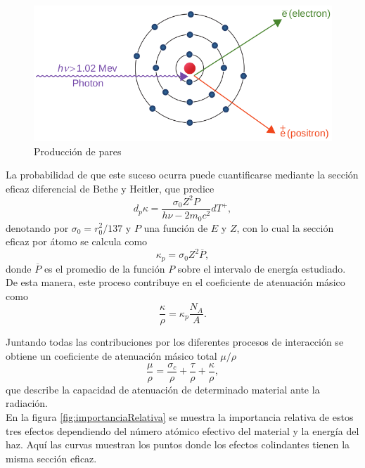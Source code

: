 \begin{figure}[H]
	\centering
	\includegraphics[width=0.7\linewidth]{images/produccionPares.png}
	\caption{Producción de pares \cite{khan2014the}}
	\label{fig:Pares}
\end{figure}

La probabilidad de que este suceso ocurra puede cuantificarse mediante la sección eficaz diferencial de Bethe y Heitler, que predice 
\begin{equation}
	d_{p}\kappa=\frac{\sigma_0 Z^2 P}{h\nu -2m_0c^2}dT^{+}, 
\end{equation}
denotando por $\sigma_0=r_{0}^2/137$ y $P$ una función de $E$ y $Z$, con lo cual la sección eficaz por átomo se calcula como
\begin{equation}
	\kappa_{p}=\sigma_0Z^2\overline{P},
\end{equation}
donde $\overline{P}$ es el promedio de la función $P$ sobre el intervalo de energía estudiado.\\

De esta manera, este proceso contribuye en el coeficiente de atenuación másico como
\begin{equation}
	\frac{\kappa}{\rho}=\kappa_{p}\frac{N_A}{A}.
\end{equation}

Juntando todas las contribuciones por los diferentes procesos de interacción se obtiene un coeficiente de atenuación másico total $\mu/\rho$
\begin{equation}
	\frac{\mu}{\rho}=\frac{\sigma_c}{\rho}+\frac{\tau}{\rho}+\frac{\kappa}{\rho},
\end{equation}
que describe la capacidad de atenuación de determinado material ante la radiación.\\

En la figura \ref{fig:importanciaRelativa} se muestra la importancia relativa de estos tres efectos dependiendo del número atómico efectivo del material y la energía del haz. Aquí las curvas muestran los puntos donde los efectos colindantes tienen la misma sección eficaz.

